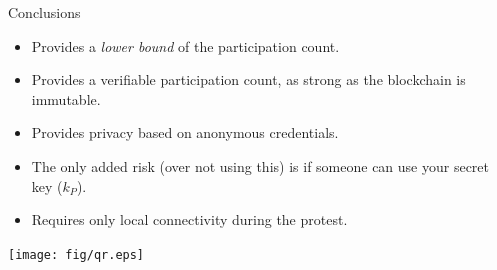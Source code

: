 \begin{columns}[t]
\begin{column}{0.32\linewidth}
    \begin{purpleblock}{Conclusions}
      \begin{itemize}
        \item Provides a \emph{lower bound} of the participation count.
        \item Provides a verifiable participation count, as strong as the 
          blockchain is immutable.
        \item Provides privacy based on anonymous credentials.
        \item The only added risk (over not using this) is if someone can use 
          your secret key (\(k_P\)).
        \item Requires only local connectivity during the protest.
      \end{itemize}
    \end{purpleblock}

    \printbibliography[heading=none]

    \begin{center}
      \texttt{[image: fig/qr.eps]}
    \end{center}

  \end{column}

\end{columns}

